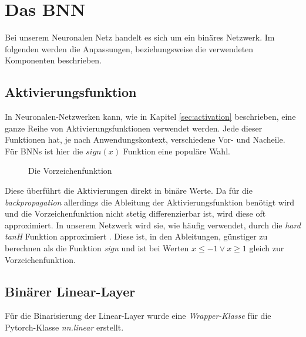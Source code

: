 \chapter{Das BNN}
Bei unserem Neuronalen Netz handelt es sich um ein binäres Netzwerk. Im folgenden werden die Anpassungen, beziehungsweise die verwendeten Komponenten beschrieben.
\section{Aktivierungsfunktion}
In Neuronalen-Netzwerken kann, wie in Kapitel \ref{sec:activation} beschrieben, eine ganze Reihe von Aktivierungsfunktionen verwendet werden. Jede dieser Funktionen hat, je nach Anwendungskontext, verschiedene Vor- und Nacheile.\\
Für BNNs ist hier die $sign(x)$ Funktion eine populäre Wahl.
\begin{figure}[h]
	\centering
	\caption{Die Vorzeichenfunktion}
	\label{fig:sign}
\end{figure} 
Diese überführt die Aktivierungen direkt in binäre Werte. Da für die \textit{backpropagation} allerdings die Ableitung der Aktivierungsfunktion benötigt wird und die Vorzeichenfunktion nicht stetig differenzierbar ist, wird diese oft approximiert. In unserem Netzwerk wird sie, wie häufig verwendet, durch die \textit{hard tanH} Funktion approximiert \cite{DBLP:journals/corr/abs-2012-00938}. Diese ist, in den Ableitungen, günstiger zu berechnen als die Funktion \textit{sign} und ist bei Werten $x\leq-1 \vee x \geq 1$ gleich zur Vorzeichenfunktion.
\section{Binärer Linear-Layer}
Für die Binarisierung der Linear-Layer wurde eine \textit{Wrapper-Klasse} für die Pytorch-Klasse \textit{nn.linear} erstellt.

